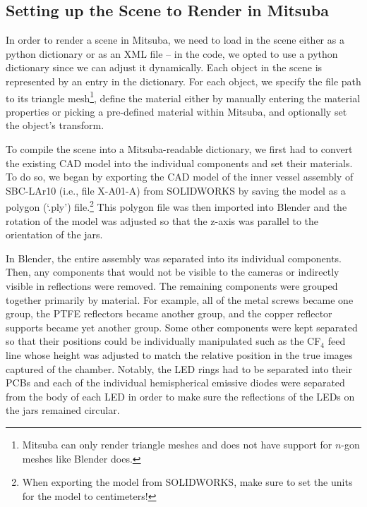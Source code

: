 \documentclass[11pt, letterpaper]{extarticle} %
\begin{document}
\subsection{Setting up the Scene to Render in Mitsuba} \label{subsec:setting_up_the_scene_to_render_in_mitsuba}
In order to render a scene in Mitsuba, we need to load in the scene either as a python dictionary or as an XML file -- in the code, we opted to use a python dictionary since we can adjust it dynamically. Each object in the scene is represented by an entry in the dictionary. For each object, we specify the file path to its triangle mesh\footnote{Mitsuba can only render triangle meshes and does not have support for $n$-gon meshes like Blender does.}, define the material either by manually entering the material properties or picking a pre-defined material within Mitsuba, and optionally set the object's transform. 

To compile the scene into a Mitsuba-readable dictionary, we first had to convert the existing CAD model into the individual components and set their materials. To do so, we began by exporting the CAD model of the inner vessel assembly of SBC-LAr10 (i.e., file X-A01-A) from SOLIDWORKS by saving the model as a polygon (`.ply') file.\footnote{When exporting the model from SOLIDWORKS, make sure to set the units for the model to centimeters!} This polygon file was then imported into Blender and the rotation of the model was adjusted so that the z-axis was parallel to the orientation of the jars. 

In Blender, the entire assembly was separated into its individual components. Then, any components that would not be visible to the cameras or indirectly visible in reflections were removed. The remaining components were grouped together primarily by material. For example, all of the metal screws became one group, the PTFE reflectors became another group, and the copper reflector supports became yet another group. Some other components were kept separated so that their positions could be individually manipulated such as the CF$_4$ feed line whose height was adjusted to match the relative position in the true images captured of the chamber. Notably, the LED rings had to be separated into their PCBs and each of the individual hemispherical emissive diodes were separated from the body of each LED in order to make sure the reflections of the LEDs on the jars remained circular. 
\end{document}
